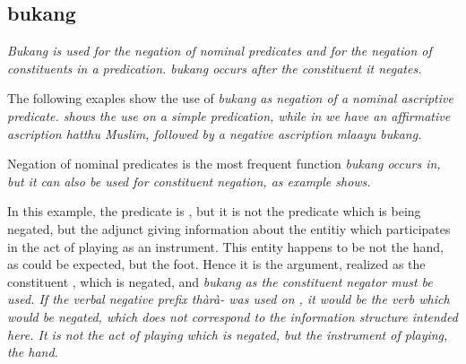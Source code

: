 %
%



\subsection{bukang}\label{sec:wc:bukang}
\em Bukang \em is used for the negation of nominal predicates and for the negation of constituents in a predication. \em bukang \em occurs after the constituent it negates.



The following exaples show the use of \em bukang \em as negation of a nominal ascriptive predicate.  shows the use on a simple predication, while in  we have an affirmative ascription \em hatthu Muslim\em, followed by a negative ascription \em mlaayu bukang\em.




Negation of nominal predicates is the most frequent function \em bukang \em occurs in, but it can also be used for constituent negation, as example  shows.



In this example, the predicate is , but it is not the predicate which is being negated, but the adjunct giving information about the entitiy which participates in the act of playing as an instrument. This entity happens to be not the hand, as could be expected, but the foot. Hence it is the argument, realized as the constituent , which is negated, and \em bukang \em as the constituent negator must be used. If the verbal negative prefix \em thàrà- \em was used on , it would be the verb which would be negated, which does not correspond to the information structure intended here. It is not the act of playing which is negated, but the instrument of playing, the hand.

